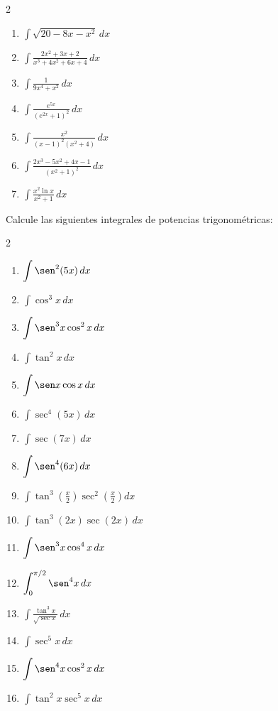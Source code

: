\begin{prob}
\begin{multicols}{2}
\begin{enumerate}
\item $\displaystyle\int\sqrt{20-8x-x^2}\,dx$
\item $\displaystyle\int\frac{2x^2+3x+2}{x^3+4x^2+6x+4}\,dx$
\item $\displaystyle\int\frac{1}{9x^4+x^2}\,dx$
\item $\displaystyle\int\frac{e^{5x}}{(e^{2x}+1)^2}\,dx$
\item $\displaystyle\int\frac{x^2}{(x-1)^2(x^2+4)}\,dx$
\item $\displaystyle\int\frac{2x^3-5x^2+4x-1}{(x^2+1)^2}\,dx$
\item $\displaystyle\int\frac{x^2\ln x}{x^2+1}\,dx$
\end{enumerate}
\end{multicols}
\end{prob}

\begin{prob}
Calcule las siguientes integrales de potencias trigonométricas:
\begin{multicols}{2}
\begin{enumerate}
\item $\displaystyle\int\sen^2(5x)\,dx$
\item $\displaystyle\int\cos^3 x\,dx$
\item $\displaystyle\int\sen^3 x\cos^2 x\,dx$
\item $\displaystyle\int\tan^2 x\,dx$
\item $\displaystyle\int\sen x\cos x\,dx$
\item $\displaystyle\int\sec^4(5x)\,dx$
\item $\displaystyle\int\sec(7x)\,dx$
\item $\displaystyle\int\sen^4(6x)\,dx$
\item $\displaystyle\int\tan^3\!\left(\tfrac{x}{2}\right)\sec^2\!\left(\tfrac{x}{2}\right)dx$
\item $\displaystyle\int\tan^3(2x)\sec(2x)\,dx$
\item $\displaystyle\int\sen^3 x\cos^4 x\,dx$
\item $\displaystyle\int_{0}^{\pi/2}\sen^4 x\,dx$
\item $\displaystyle\int\frac{\tan^3 x}{\sqrt{\sec x}}\,dx$
\item $\displaystyle\int\sec^5 x\,dx$
\item $\displaystyle\int\sen^4 x\cos^2 x\,dx$
\item $\displaystyle\int\tan^2 x\sec^5 x\,dx$
\end{enumerate}
\end{multicols}
\end{prob}

